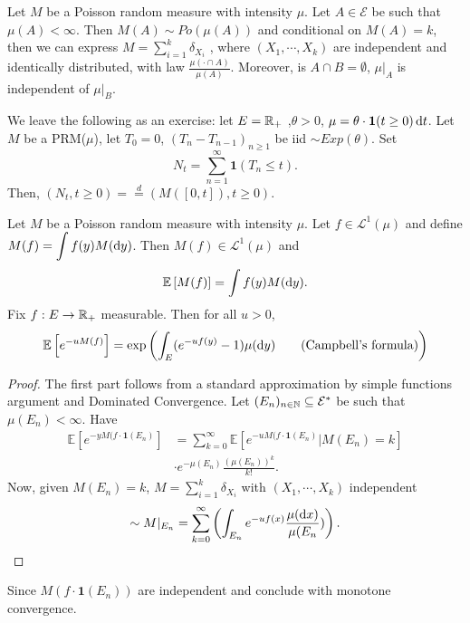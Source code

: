 \documentclass{article}
\begin{document}
\begin{boxprop}\label{prop: prm conditioning}
Let $ M$ be a Poisson random measure with intensity $ \mu$. Let $ A\in \mathcal{E}$ be such that $ \mu(A)<\infty$. Then $ M(A)\sim Po(\mu(A))$ and conditional on $ M(A) = k$, then we can express $ M  =\displaystyle\sum^{k}_{i=1} \delta_{X_{i}}$
, where $ (X_{1}, \cdots, X_{k})$ are independent and identically distributed, with law $ \frac{\mu(\cdot \cap A)}{\mu(A)}$. Moreover, is $ A\cap B = \emptyset$, $ \mu|_{A}$ is independent of $ \mu|_{B}$.
\end{boxprop}
	

We leave the following as an exercise: let $ E = \mathbb{R}_{+}$ ,$ \theta >0$, $ \mu = \theta\cdot \mathbf{1}(t\geq 0 ) \operatorname{d}\!  t$. Let $ M$ be a PRM($ \mu$), let $ T_{0}=0$, $ (T_{n}-T_{n-1})_{n\geq 1}$ be iid $ \sim Exp(\theta)$. Set 
\[
N_{t} =\displaystyle\sum^{\infty}_{n=1} \mathbf{1}(T_{n}\leq t). 
\]
Then, $ (N_{t}, t\geq 0) =\stackrel{d}{=} (M([0,t]), t\geq 0)$.

\begin{theorem}\label{thm: integral wrt poisson random integral}
Let $ M$ be a Poisson random measure with intensity $ \mu$. Let $ f\in \mathcal{L}^{1}(\mu) $ and define $ M(f) = \displaystyle\int f(y) M(\operatorname{d}\! y)  $. Then $ M(f)\in \mathcal{L}^{1}(\mu) $ and 
\[
 \mathbb{E}\left[ M(f) \right] = \displaystyle\int f(y) M (\operatorname{d}\! y).   
\]
Fix $ f:E\to \mathbb{R}_{+}$ measurable. Then for all $ u>0$, 
\[
	\mathbb{E}\left[ e^{-uM(f)} \right] = \exp \left( \displaystyle\int_{E}(e^{-uf(y)}-1) \mu(\diff y)\tag{\text{Campbell's formula}}   \right)
\]

\end{theorem}

\begin{proof}
    The first part follows from a standard approximation by simple functions argument and Dominated Convergence. Let $ (E_{n})_{n\in \mathbb{N}}\subseteq  \mathcal{E}^{*}$ be such that $ \mu(E_{n})<\infty$. Have 
    \[
    \begin{array}{ll}
        \mathbb{E}\left[ e^{-yM(f\cdot \mathbf{1}(E_{n})} \right] &=\displaystyle\sum^{\infty}_{k=0} \mathbb{E}\left[  e^{-uM(f\cdot \mathbf{1}(E_{n})}| M(E_{n})=k \right]\\
         &\cdot e^{-\mu(E_{n})}\frac{(\mu(E_{n}))^{k}}{k!} .
    \end{array}
    \]
    Now, given $ M(E_{n}) = k$, $ M =\displaystyle\sum^{k}_{i=1}\delta_{X_{i}} $ with $ (X_{1}, \cdots, X_{k})$ independent 
    \[ \sim M|_{E_{n}} =\displaystyle\sum^{\infty}_{k=0} \left( \displaystyle\int_{E_{n}} e^{-uf(x)} \frac{\mu( \operatorname{d}\!  x)}{\mu(E_{n}})    \right). \]
\end{proof}
Since $ M(f\cdot \mathbf{1}(E_{n}))$ are independent and conclude with monotone convergence.
\end{document}
